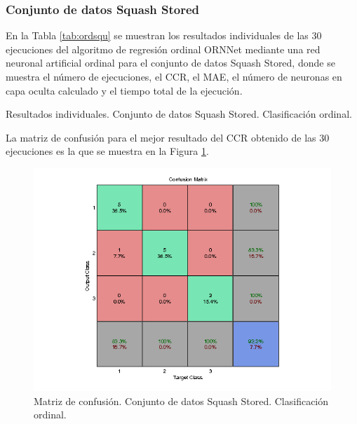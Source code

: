 			\subsubsection{Conjunto de datos Squash Stored}
			
			En la Tabla \ref{tab:ordsqu} se muestran los resultados individuales de las 30 ejecuciones del algoritmo de regresión ordinal ORNNet mediante una red neuronal artificial ordinal para el conjunto de datos Squash Stored, donde se muestra el número de ejecuciones, el CCR, el MAE, el número de neuronas en capa oculta calculado y el tiempo total de la ejecución.\\
			
			\begin{table}[!htbp]
				\centering
				\caption{Resultados individuales. Conjunto de datos Squash Stored. Clasificación ordinal.}
				\label{tab:ordsqu}
			\end{table}
			
			La matriz de confusión para el mejor resultado del CCR obtenido de las 30 ejecuciones es la que se muestra en la Figura \ref{fig:ordsqu}.
			
			\begin{figure}[htbp]
				\centering
				\includegraphics[scale=0.8]{../src/results/ordinal/squash-stored_mc1.png}
				\caption{Matriz de confusión. Conjunto de datos Squash Stored. Clasificación ordinal.}
				\label{fig:ordsqu}
			\end{figure}
			
